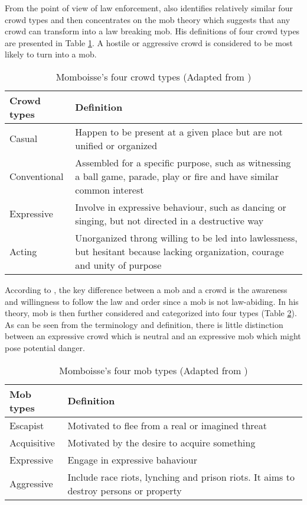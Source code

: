 From the point of view of law enforcement, \citet{Momboisse1967} also identifies relatively similar four crowd types and then concentrates on the mob theory which suggests that any crowd can transform into a law breaking mob. His definitions of four crowd types are presented in Table \ref{table:momboisseCrowdType}. A hostile or aggressive crowd is considered to be most likely to turn into a mob.

\begin{table}
	\caption{Momboisse's four crowd types (Adapted from \citet{Schweingruber2000})}
	\label{table:momboisseCrowdType}
	\centering
	\begin{tabular}{|l|p{10cm}|}
	\hline
	\textbf{Crowd types} & \textbf{Definition} \\
	\hline
	Casual & Happen to be present at a given place but are not unified or organized \\
	Conventional & Assembled for a specific purpose, such as witnessing a ball game, parade, play or fire 
	and have similar common interest \\
	Expressive & Involve in expressive behaviour, such as dancing or singing, but not directed in a destructive way \\
	Acting & Unorganized throng willing to be led into lawlessness, but hesitant because lacking organization, courage and unity of purpose \\
	\hline
	\end{tabular}
\end{table}


According to \citet{Momboisse1967}, the key difference between a mob and a crowd is the awareness and willingness to follow the law and order since a mob is not law-abiding. In his theory, mob is then further considered and categorized into four types (Table \ref{table:momboisseMobType}). As can be seen from the terminology and definition, there is little distinction between an expressive crowd which is neutral and an expressive mob which might pose potential danger.

\begin{table}
	\caption{Momboisse's four mob types (Adapted from \citet{Schweingruber2000})}
	\label{table:momboisseMobType}
	\centering
	\begin{tabular}{|l|p{10cm}|}
	\hline
	\textbf{Mob types} & \textbf{Definition} \\
	\hline
	Escapist & Motivated to flee from a real or imagined threat \\
	Acquisitive &  Motivated by the desire to acquire something \\
	Expressive & Engage in expressive bahaviour \\
	Aggressive & Include race riots, lynching and prison riots. It aims to destroy persons or property \\
	\hline
	\end{tabular}
\end{table}


